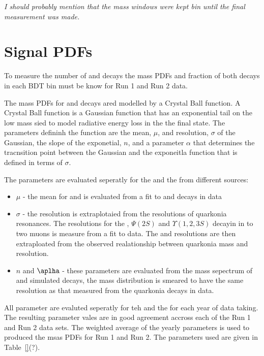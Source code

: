 {\it I should probably mention that the mass windows were kept bin until the final measurement was made.}

\section{Signal PDFs}
\label{sec:signalPdfs}

To measure the number of \bdmumu and \bsmumu decays the mass PDFs and fraction of both decays in each BDT bin must be know for Run 1 and Run 2 data.

The mass PDFs for \bdmumu and \bsmumu decays ared modelled by a Crystal Ball function. A Crystal Ball function is a Gaussian function that has an exponential tail on the low mass sied to model radiative energy loss in the the final state. The parameters defininh the function are the mean, $\mu$, and resolution, $\sigma$ of the Gaussian, the slope of the exponetial, $n$, and a parameter $\alpha$ that determines the tracnsition point between the Gaussian and the exponeitla function that is defined in terms of $\sigma$. 

The parameters are evaluated seperatly for the \bs and the \bd from different sources:
\begin{itemize}
\item $\mu$ - the mean for \bs and \bd is evaluated from a fit to \bskk and \bdkpi decays in data
\item $\sigma$ - the resolution is extraplotaied from the resolutions of quarkonia resonances. The resolutions for the \jpsi, $\Psi (2S)$ and $\Upsilon(1, 2, 3S)$ decayin in to two muons is measure from a fit to data. The \bs and \bd resolutions are then extraploated from the observed realationship between quarkonia mass and resolution.
\item $n$ and $\aplha$ - these parameters are evaluated from the mass sepectrum of \bsmumu and \bdmumu simulated decays, the mass distribution is smeared to have the same resolution as that measured from the quarkonia decays in data.
\end{itemize}

All parameter are evaluted seperatly for teh \bd and the \bs for each year of data taking. The resulting parameter vales are in good agreement accross each of the Run 1 and Run 2 data sets. The weighted average of the yearly parameters is used to produced the msas PDFs for Run 1 and Run 2. The parameters used are given in Table~\ref{}(?).



